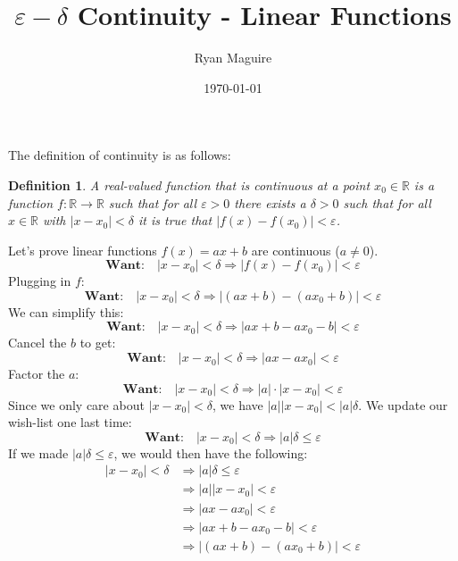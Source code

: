 \documentclass{article}
\title{$\varepsilon-\delta$ Continuity - Linear Functions}
\author{Ryan Maguire}
\date{\today}
\theoremstyle{normal}
\newtheorem{definition}{Definition}
\begin{document}
    \maketitle
    The definition of continuity is as follows:
    \begin{definition}
        A real-valued function that is continuous at a point
        $x_{0}\in\mathbb{R}$ is a function $f:\mathbb{R}\rightarrow\mathbb{R}$
        such that for all $\varepsilon>0$ there exists a $\delta>0$ such that
        for all $x\in\mathbb{R}$ with $|x-x_{0}|<\delta$ it is true that
        $|f(x)-f(x_{0})|<\varepsilon$.
    \end{definition}
    Let's prove linear functions $f(x)=ax+b$ are continuous ($a\ne{0}$).
    \begin{equation}
        \textbf{Want:}\quad
        |x-x_{0}|<\delta\Rightarrow
        |f(x)-f(x_{0})|<\varepsilon
    \end{equation}
    Plugging in $f$:
    \begin{equation}
        \textbf{Want:}\quad
        |x-x_{0}|<\delta
        \Rightarrow|(ax+b)-(ax_{0}+b)|<\varepsilon
    \end{equation}
    We can simplify this:
    \begin{equation}
        \textbf{Want:}\quad
        |x-x_{0}|<\delta
        \Rightarrow
        |ax+b-ax_{0}-b|<\varepsilon
    \end{equation}
    Cancel the $b$ to get:
    \begin{equation}
        \textbf{Want:}\quad
        |x-x_{0}|<\delta
        \Rightarrow
        |ax-ax_{0}|<\varepsilon
    \end{equation}
    Factor the $a$:
    \begin{equation}
        \textbf{Want:}\quad
        |x-x_{0}|<\delta
        \Rightarrow
        |a|\cdot|x-x_{0}|<\varepsilon
    \end{equation}
    Since we only care about $|x-x_{0}|<\delta$, we have
    $|a||x-x_{0}|<|a|\delta$. We update our wish-list one last time:
    \begin{equation}
        \textbf{Want:}\quad
        |x-x_{0}|<\delta
        \Rightarrow|a|\delta\leq\varepsilon
    \end{equation}
    If we made $|a|\delta\leq\varepsilon$, we would then have the following:
    \begin{align}
        |x-x_{0}|<\delta&\Rightarrow|a|\delta\leq\varepsilon\\
        &\Rightarrow|a||x-x_{0}|<\varepsilon\\
        &\Rightarrow|ax-ax_{0}|<\varepsilon\\
        &\Rightarrow|ax+b-ax_{0}-b|<\varepsilon\\
        &\Rightarrow|(ax+b)-(ax_{0}+b)|<\varepsilon
    \end{align}
\end{document}

